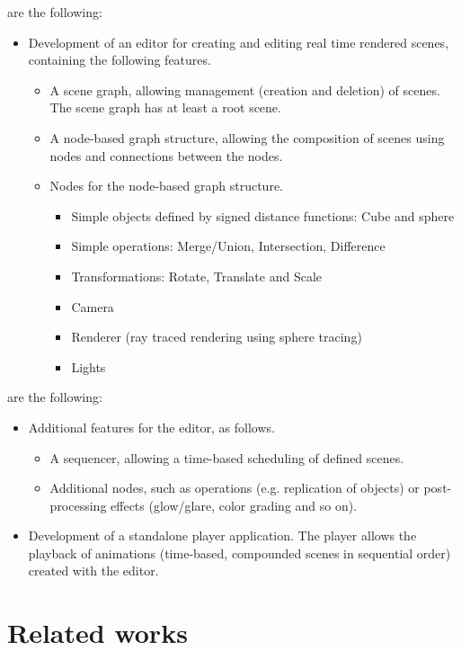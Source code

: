 \documentclass[%
    a4paper,    %
    justified,  %
    nobib,      %
    openany     %
]{tufte-book}
\begin{document}
 are the following:
\begin{itemize}
  \item Development of an editor for creating and editing real time rendered
    scenes, containing the following features.
    \begin{itemize}
      \item A scene graph, allowing management (creation and deletion) of
        scenes. The scene graph has at least a root scene.
    \item A node-based graph structure, allowing the composition of scenes using
      nodes and connections between the nodes.
    \item Nodes for the node-based graph structure.
      \begin{itemize}
        \item Simple objects defined by signed distance functions: Cube and
          sphere
        \item Simple operations: Merge/Union, Intersection, Difference
        \item Transformations: Rotate, Translate and Scale
        \item Camera
        \item Renderer (ray traced rendering using sphere tracing)
        \item Lights
      \end{itemize}
    \end{itemize}
\end{itemize}

 are the following:
\begin{itemize}
  \item Additional features for the editor, as follows.
  \begin{itemize}
    \item A sequencer, allowing a time-based scheduling of defined scenes.
    \item Additional nodes, such as operations (e.g. replication of objects)
      or post-processing effects (glow/glare, color grading and so on).
  \end{itemize}
  \item Development of a standalone player application. The player allows the
    playback of animations (time-based, compounded scenes in sequential order)
    created with the editor.
\end{itemize}

\section{Related works}
\label{sec:related-works}
\end{document}
